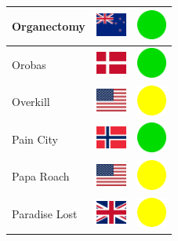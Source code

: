 \documentclass[12pt, a4paper, twoside]{report}
\begin{document}
\begin{center}
\begin{longtable}{|p{5cm}|p{2cm}|p{2cm}|}
Organectomy & \includegraphics[width=1cm]{4x3/nz} & \includegraphics[width=1cm]{likes/y} \\ \hline
Orobas & \includegraphics[width=1cm]{4x3/dk} & \includegraphics[width=1cm]{likes/y} \\ \hline
Overkill & \includegraphics[width=1cm]{4x3/us} & \includegraphics[width=1cm]{likes/m} \\ \hline
Pain City & \includegraphics[width=1cm]{4x3/no} & \includegraphics[width=1cm]{likes/y} \\ \hline
Papa Roach & \includegraphics[width=1cm]{4x3/us} & \includegraphics[width=1cm]{likes/m} \\ \hline
Paradise Lost & \includegraphics[width=1cm]{4x3/gb} & \includegraphics[width=1cm]{likes/m} \\ \hline

\end{longtable}
\end{center}
\end{document}
